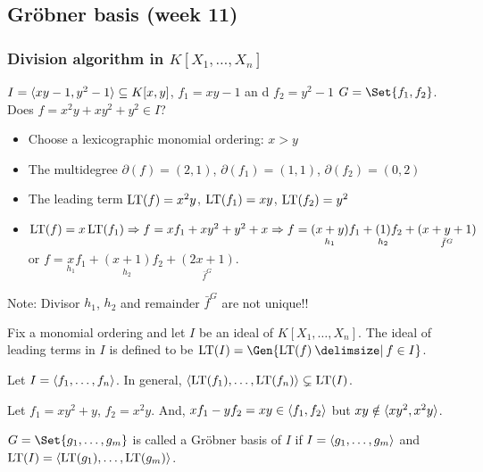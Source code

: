 \subsection{Gr\"{o}bner basis (week 11)}

\subsubsection{Division algorithm in $K[X_1,\dots,X_n]$}

\begin{example}
  $I = \langle xy-1,y^2-1 \rangle \subseteq K[x,y]$, $f_1 = xy-1$ an
  d $f_2 = y^2-1$ $G=\Set{f_1,f_2}$. Does $f = x^2y+xy^2+y^2 \in I$?
  \begin{itemize}
      \item Choose a lexicographic monomial ordering: $x > y$
      \item The multidegree $\partial(f) = (2,1)$, $\partial(f_1) = (1,1)$,
        $\partial(f_2) = (0,2)$
      \item The leading term $\operatorname{LT}(f) = x^2y$, $\operatorname{LT}(f_1) = xy$, $\operatorname{LT}(f_2) = y^2$
      \item $\operatorname{LT}(f) = x\operatorname{LT}(f_1) \Rightarrow f = xf_1+xy^2+y^2+x \Rightarrow f = \underset{h_1}{(x+y)}f_1+\underset{h_2}{(1)}f_2+\underset{\bar{f}^G}{(x+y+1)}$ or $f = \underset{h_1}{x}f_1+\underset{h_2}{(x+1)}f_2+\underset{\bar{f}^G}{(2x+1)}$.
  \end{itemize}
  Note:  Divisor $h_1$, $h_2$ and remainder $\bar{f}^G$ are not unique!! 
\end{example}

\begin{definition}
  Fix a monomial ordering and let $I$ be an ideal of $K[X_1,\dots,X_n]$.
  The ideal of leading terms in $I$ is defined to be
  $\LT(I) = \Gen{ \LT(f) \given f\in I }$.
\end{definition}

\begin{remark}
  Let $I = \langle f_1,\dots,f_n \rangle$. In general, $\langle\operatorname{LT}(f_1),\dots,\operatorname{LT}(f_n)\rangle
  \subsetneq \operatorname{LT}(I)$.
\end{remark}

\begin{example}
  Let $f_1=xy^2+y$, $f_2=x^2y$. And, $xf_1-yf_2=xy \in \langle f_1,f_2 \rangle$ but
  $xy \notin \langle xy^2, x^2y \rangle$.
\end{example}

\begin{definition}
  $G = \Set{g_1,\dots,g_m}$ is called a Gr\"{o}bner basis of $I$ if
  $I = \langle g_1,\dots,g_m \rangle$ and $\operatorname{LT}(I) = \langle \operatorname{LT}(g_1),\dots,\operatorname{LT}(g_m) \rangle$.
\end{definition}

